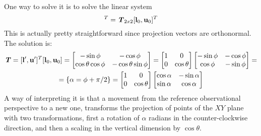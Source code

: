One way to solve it is to solve the linear system 
\begin{equation}
[\vec{l}', \vec{u}']^T = \myMatrix{T}_{2x2} [\vec{l}_0, \vec{u}_0]^T
\end{equation}
This is actually pretty straightforward since projection vectors are orthonormal. The solution is:
\begin{multline}
\bm{\mathit{T}} = [\mathbf{l}', \mathbf{u}']^T [\mathbf{l}_0, \mathbf{u}_0] = \begin{bmatrix}
-\sin\phi & -\cos\phi \\
\cos\theta \cos\phi & -\cos\theta \sin\phi
\end{bmatrix} = \begin{bmatrix}
1 & 0\\
0 & \cos\theta
\end{bmatrix} \begin{bmatrix}
-\sin\phi & -\cos\phi \\
\cos\phi & -\sin\phi
\end{bmatrix} = \\
= \left\{\alpha = \phi + \pi/2\right\} = \begin{bmatrix}
	1 & 0\\
	0 & \cos\theta
\end{bmatrix} \begin{bmatrix}
	\cos\alpha & -\sin\alpha \\
	\sin\alpha & \cos\alpha
\end{bmatrix}
\end{multline}
A way of interpreting it is that a movement from the reference observational perspective to a new one, transforms the projection of points of the $XY$ plane with two transformations, first a rotation of $\alpha$ radians in the counter-clockwise direction, and then a scaling in the vertical dimension by $\cos\theta$.

